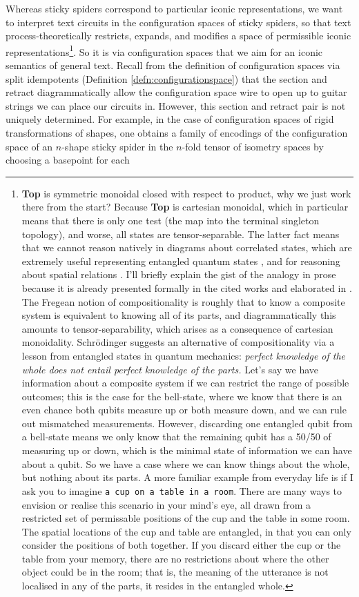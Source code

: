 Whereas sticky spiders correspond to particular iconic representations, we want to interpret text circuits in the configuration spaces of sticky spiders, so that text process-theoretically restricts, expands, and modifies a space of permissible iconic representations\footnote{\textbf{Top} is symmetric monoidal closed with respect to product, why we just work there from the start? Because \textbf{Top} is cartesian monoidal, which in particular means that there is only one test (the map into the terminal singleton topology), and worse, all states are tensor-separable. The latter fact means that we cannot reason natively in diagrams about correlated states, which are extremely useful representing entangled quantum states \citep{coecke_picturing_2017}, and for reasoning about spatial relations \citep{wang-mascianica_talking_2021}. I'll briefly explain the gist of the analogy in prose because it is already presented formally in the cited works and elaborated in \citep{coecke_compositionality_2021}. The Fregean notion of compositionality is roughly that to know a composite system is equivalent to knowing all of its parts, and diagrammatically this amounts to tensor-separability, which arises as a consequence of cartesian monoidality. Schr\"{o}dinger suggests an alternative of compositionality via a lesson from entangled states in quantum mechanics: \emph{perfect knowledge of the whole does not entail perfect knowledge of the parts.} Let's say we have information about a composite system if we can restrict the range of possible outcomes; this is the case for the bell-state, where we know that there is an even chance both qubits measure up or both measure down, and we can rule out mismatched measurements. However, discarding one entangled qubit from a bell-state means we only know that the remaining qubit has a 50/50 of measuring up or down, which is the minimal state of information we can have about a qubit. So we have a case where we can know things about the whole, but nothing about its parts. A more familiar example from everyday life is if I ask you to imagine \texttt{a cup on a table in a room}. There are many ways to envision or realise this scenario in your mind's eye, all drawn from a restricted set of permissable positions of the cup and the table in some room. The spatial locations of the cup and table are entangled, in that you can only consider the positions of both together. If you discard either the cup or the table from your memory, there are no restrictions about where the other object could be in the room; that is, the meaning of the utterance is not localised in any of the parts, it resides in the entangled whole.}. So it is via configuration spaces that we aim for an iconic semantics of general text. Recall from the definition of configuration spaces via split idempotents (Definition \ref{defn:configurationspace}) that the section and retract diagrammatically allow the configuration space wire to open up to guitar strings we can place our circuits in. However, this section and retract pair is not uniquely determined. For example, in the case of configuration spaces of rigid transformations of shapes, one obtains a family of encodings of the configuration space of an $n$-shape sticky spider in the $n$-fold tensor of isometry spaces by choosing a basepoint for each 